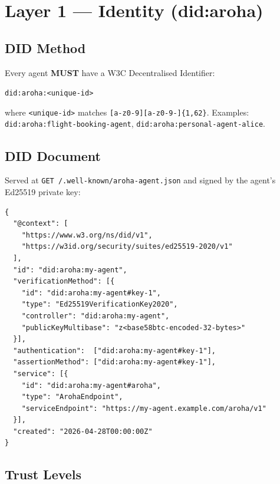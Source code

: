 \documentclass[11pt,a4paper]{article}
\begin{document}
\section{Layer 1 --- Identity (did:aroha)}

\subsection{DID Method}

Every agent \textbf{MUST} have a W3C Decentralised Identifier:
\begin{center}
  \texttt{did:aroha:<unique-id>}
\end{center}

where \texttt{<unique-id>} matches \texttt{[a-z0-9][a-z0-9-]\{1,62\}}.
Examples: \texttt{did:aroha:flight-booking-agent}, \texttt{did:aroha:personal-agent-alice}.

\subsection{DID Document}

Served at \texttt{GET /.well-known/aroha-agent.json} and signed by the agent's
Ed25519 private key:

\begin{lstlisting}[caption=DID Document structure]
{
  "@context": [
    "https://www.w3.org/ns/did/v1",
    "https://w3id.org/security/suites/ed25519-2020/v1"
  ],
  "id": "did:aroha:my-agent",
  "verificationMethod": [{
    "id": "did:aroha:my-agent#key-1",
    "type": "Ed25519VerificationKey2020",
    "controller": "did:aroha:my-agent",
    "publicKeyMultibase": "z<base58btc-encoded-32-bytes>"
  }],
  "authentication":  ["did:aroha:my-agent#key-1"],
  "assertionMethod": ["did:aroha:my-agent#key-1"],
  "service": [{
    "id": "did:aroha:my-agent#aroha",
    "type": "ArohaEndpoint",
    "serviceEndpoint": "https://my-agent.example.com/aroha/v1"
  }],
  "created": "2026-04-28T00:00:00Z"
}
\end{lstlisting}

\subsection{Trust Levels}
\end{document}
